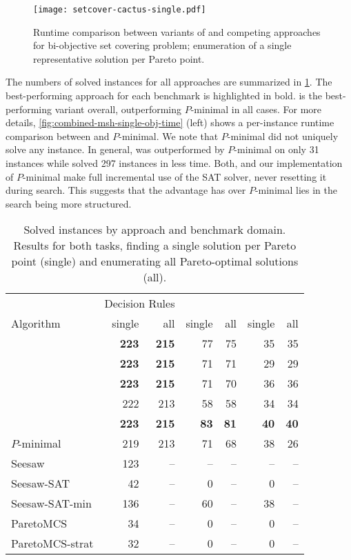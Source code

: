 \begin{figure}
    \centering
    \texttt{[image: setcover-cactus-single.pdf]}
    \caption{Runtime comparison between variants of \algname{} and competing approaches for bi-objective set covering problem;
      enumeration of a single representative solution per Pareto point.
    }\label{fig:setcover-cactus-single}
\end{figure}

The numbers of solved instances for all approaches are summarized in \cref{tab:nsolved}.
The best-performing approach for each benchmark is highlighted in bold.
\msh{} is the best-performing \algname{} variant overall, outperforming $P$-minimal in all cases.
For more details, \cref{fig:combined-msh-single-obj-time} (left) shows a per-instance runtime comparison between \msh{} and $P$-minimal.
We note that $P$-minimal did not uniquely solve any instance.
In general, \msh{} was outperformed by $P$-minimal on only 31 instances while \msh{} solved 297 instances in less time.
Both, \algname{} and our implementation of $P$-minimal make full incremental use of the SAT solver, never resetting it during search.
This suggests that the advantage \algname{} has over $P$-minimal lies in the search being more structured.

\begin{table}
  \centering
  \caption{Solved instances by approach and benchmark domain.
    Results for both tasks, finding a single solution per Pareto point (single) and enumerating all Pareto-optimal solutions (all).
  }\label{tab:nsolved}
  \begin{tabular}{@{}l@{\hspace{2em}}rrrrrr@{}}
    \toprule
    & \multicolumn{2}{c}{Decision Rules} & \multicolumn{2}{c}{\scep{}} & \multicolumn{2}{c}{\scsc{}} \\
    Algorithm & single & all & single & all & single & all \\
    \midrule
    \satunsat{} & \textbf{223} & \textbf{215} & 77 & 75 & 35 & 35 \\
    \unsatsat{} & \textbf{223} & \textbf{215} & 71 & 71 & 29 & 29 \\
    \msu{} & \textbf{223} & \textbf{215} & 71 & 70 & 36 & 36 \\
    \oll{} & 222 & 213 & 58 & 58 & 34 & 34 \\
    \msh{} & \textbf{223} & \textbf{215} & \textbf{83} & \textbf{81} & \textbf{40} & \textbf{40} \\\addlinespace
    $P$-minimal & 219 & 213 & 71 & 68 & 38 & 26 \\\addlinespace
    Seesaw & 123 & -- & -- & -- & -- & -- \\
    Seesaw-SAT & 42 & -- & 0 & -- & 0 & -- \\
    Seesaw-SAT-min & 136 & -- & 60 & -- & 38 & -- \\\addlinespace
    ParetoMCS & 34 & -- & 0 & -- & 0 & -- \\
    ParetoMCS-strat & 32 & -- & 0 & -- & 0 & -- \\
    \bottomrule
  \end{tabular}
\end{table}

